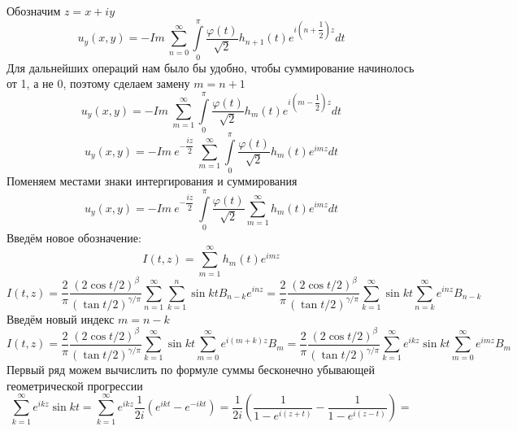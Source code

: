 \documentclass[9pt]{article}
\begin{document}
		Обозначим $z = x + iy$
		\begin{equation*}
			u_y(x,y)  = -  Im \ \sum\limits_{n=0}^{\infty}  \int\limits_0^\pi \dfrac{\varphi(t)}{\sqrt2}  h_{n+1}(t)  e^{i\left(n+\dfrac12\right) z}  dt
		\end{equation*}
		Для дальнейших операций нам было бы удобно, чтобы суммирование начинолось от 1, а не 0, поэтому сделаем замену $m = n +1$
		\begin{equation*}
			u_y(x,y)  = -  Im \ \sum\limits_{m=1}^{\infty}  \int\limits_0^\pi \dfrac{\varphi(t)}{\sqrt2}  h_{m}(t)  e^{i\left(m-\dfrac12\right) z}  dt
		\end{equation*}
		\begin{equation*}
			u_y(x,y)  = -  Im \ e^{-\dfrac{iz}{2}}\ \sum\limits_{m=1}^{\infty}  \int\limits_0^\pi \dfrac{\varphi(t)}{\sqrt2}  h_{m}(t)  e^{im z}  dt
		\end{equation*}
		Поменяем местами знаки интергирования и суммирования
		\begin{equation*}
			u_y(x,y)  = -  Im \ e^{-\dfrac{iz}{2}}\  \int\limits_0^\pi \dfrac{\varphi(t)}{\sqrt2}  \sum\limits_{m=1}^{\infty}   h_{m}(t)  e^{im z}  dt
		\end{equation*}
		Введём новое обозначение:
		\begin{equation*}
			I(t,z) = \sum\limits_{m=1}^{\infty}  h_{m}(t)  e^{im z}
		\end{equation*}
		\begin{equation*}
			I(t,z) =\dfrac{2}{\pi}\dfrac{(2\cos{t/2})^\beta}{(\tan{t/2})^{\gamma/\pi}} \sum\limits_{n=1}^{\infty}   \sum\limits_{k=1}^n \sin{kt} B_{n-k} e^{inz} = 
			\dfrac{2}{\pi}\dfrac{(2\cos{t/2})^\beta}{(\tan{t/2})^{\gamma/\pi}} \sum\limits_{k=1}^{\infty} \sin{kt} \sum\limits_{n=k}^{\infty} e^{inz} B_{n-k}
		\end{equation*}
		Введём новый индекс $m = n - k$
		\begin{equation*}
			I(t,z) = \dfrac{2}{\pi}\dfrac{(2\cos{t/2})^\beta}{(\tan{t/2})^{\gamma/\pi}} \sum\limits_{k=1}^{\infty} \sin{kt} \sum\limits_{m =0 }^{\infty} e^{i(m+k)z} B_{m} = 
			\dfrac{2}{\pi}\dfrac{(2\cos{t/2})^\beta}{(\tan{t/2})^{\gamma/\pi}} \sum\limits_{k=1}^{\infty} e^{ikz}\sin{kt} \sum\limits_{m =0 }^{\infty} e^{imz} B_{m}
		\end{equation*}
		Первый ряд можем вычислить по формуле суммы бесконечно убывающей геометрической прогрессии
		\begin{equation*}
			\sum\limits_{k=1}^{\infty} e^{ikz}\sin{kt} =  \sum\limits_{k=1}^{\infty} e^{ikz}\dfrac{1}{2i}\left(e^{ikt} - e^{-ikt}\right) = \dfrac1{2i} \left(\dfrac{1}{1 - e^{i(z+t)}} -  \dfrac{1}{1 - e^{i(z-t)}}\right) = 
		\end{equation*}
\end{document}
